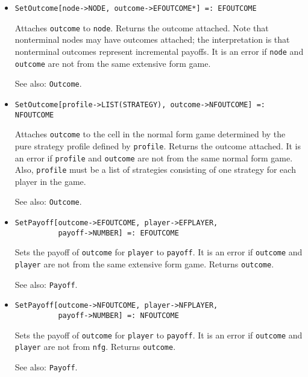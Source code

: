 \begin{itemize}
\item{}
\protect \large \begin{verbatim} 
SetOutcome[node->NODE, outcome->EFOUTCOME*] =: EFOUTCOME 
\end{verbatim}\normalsize

\bd
Attaches \verb+outcome+ to \verb+node+.  Returns the outcome attached.
Note that nonterminal nodes may have outcomes attached; the interpretation
is that nonterminal outcomes represent incremental payoffs.  
It is an error if \verb+node+ and \verb+outcome+ are not from the same
extensive form game.
\item [See also:] \verb+Outcome+.
\ed

\item{}
\protect \large \begin{verbatim} 
SetOutcome[profile->LIST(STRATEGY), outcome->NFOUTCOME] =: NFOUTCOME 
\end{verbatim}\normalsize

\bd 
Attaches \verb+outcome+ to the cell in the normal form game
determined by the pure strategy profile defined by \verb+profile+.
Returns the outcome attached.  It is an error if \verb+profile+ and
\verb+outcome+ are not from the same normal form game. Also,
\verb+profile+ must be a list of strategies consisting of one strategy
for each player in the game.  
\item [See also:] \verb+Outcome+.
\ed

\item{}
\protect \large \begin{verbatim}
SetPayoff[outcome->EFOUTCOME, player->EFPLAYER,
          payoff->NUMBER] =: EFOUTCOME 
\end{verbatim}\normalsize

\bd
Sets the payoff of \verb+outcome+ for \verb+player+ to \verb+payoff+.
It is an error if \verb+outcome+ and \verb+player+ are not from the
same extensive form game.  Returns \verb+outcome+.
\item [See also:] \verb+Payoff+.
\ed

\item{}
\protect \large \begin{verbatim}
SetPayoff[outcome->NFOUTCOME, player->NFPLAYER, 
          payoff->NUMBER] =: NFOUTCOME 
\end{verbatim}\normalsize

\bd
Sets the payoff of \verb+outcome+ for \verb+player+ to \verb+payoff+.
It is an error if \verb+outcome+ and \verb+player+ are not from \verb+nfg+.
Returns \verb+outcome+.
\item [See also:] \verb+Payoff+.
\ed


\end{itemize}
